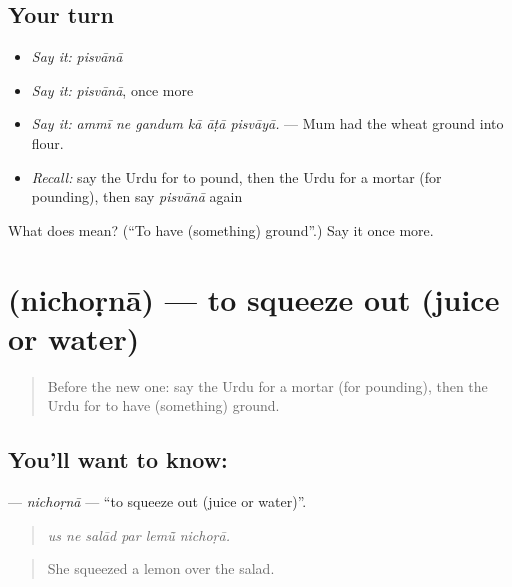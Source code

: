 \subsection*{Your turn}
\begin{itemize}
\raggedright
  \item \emph{Say it:} \emph{pisvānā}
  \item \emph{Say it:} \emph{pisvānā}, once more
  \item \emph{Say it:} \emph{ammī ne gandum kā āṭā pisvāyā.} — Mum had the wheat ground into flour.
  \item \emph{Recall:} say the Urdu for to pound, then the Urdu for a mortar (for pounding), then say \emph{pisvānā} again
\end{itemize}

\begin{tcolorbox}[breakable,colback=teal!4,colframe=teal!35!black,title={Before you move on}]
What does  mean? (\textquotedblleft{}To have (something) ground\textquotedblright{}.) Say it once more.
\end{tcolorbox}
\section[\texorpdfstring{\ur{نچوڑنا} (nichoṛnā)}{نچوڑنا (nichoṛnā)}]{ (nichoṛnā) — to squeeze out (juice or water)}

\label{lesson:UR-C510-nichorna}



\begin{quote}
Before the new one: say the Urdu for a mortar (for pounding), then the Urdu for to have (something) ground.
\end{quote}

\subsection*{You'll want to know: }
\textbf{} — \emph{nichoṛnā} — \textquotedblleft{}to squeeze out (juice or water)\textquotedblright{}.

\begin{quote}
     
\end{quote}

\begin{quote}
\emph{us ne salād par lemū̃ nichoṛā.}
\end{quote}

\begin{quote}
She squeezed a lemon over the salad.
\end{quote}

